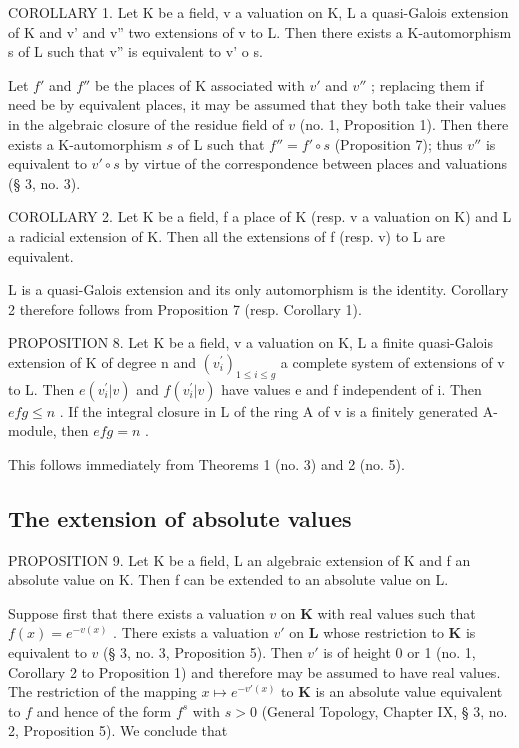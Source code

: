 COROLLARY 1. Let K be a field, v a valuation on K, L a quasi-Galois extension of K and v' and v'' two extensions of v to L. Then there exists a K-automorphism s of L such that v'' is equivalent to v' o s.

Let \(f'\) and \(f''\) be the places of K associated with \(v'\) and \(v''\) ; replacing them if need be by equivalent places, it may be assumed that they both take their values in the algebraic closure of the residue field of \(v\) (no. 1, Proposition 1). Then there exists a K-automorphism \(s\) of L such that \(f'' = f' \circ s\) (Proposition 7); thus \(v''\) is equivalent to \(v' \circ s\) by virtue of the correspondence between places and valuations (§ 3, no. 3).

COROLLARY 2. Let K be a field, f a place of K (resp. v a valuation on K) and L a radicial extension of K. Then all the extensions of f (resp. v) to L are equivalent.

L is a quasi-Galois extension and its only automorphism is the identity. Corollary 2 therefore follows from Proposition 7 (resp. Corollary 1).

PROPOSITION 8. Let K be a field, v a valuation on K, L a finite quasi-Galois extension of K of degree n and \((v_{i}^{\prime})_{1\leq i\leq g}\) a complete system of extensions of v to L. Then \(e(v_{i}^{\prime}|v)\) and \(f(v_{i}^{\prime}|v)\) have values e and f independent of i. Then \(efg \leqslant n\) . If the integral closure in L of the ring A of v is a finitely generated A-module, then \(efg = n\) .

This follows immediately from Theorems 1 (no. 3) and 2 (no. 5).

\subsection{The extension of absolute values}

PROPOSITION 9. Let K be a field, L an algebraic extension of K and f an absolute value on K. Then f can be extended to an absolute value on L.

Suppose first that there exists a valuation \(v\) on \(\mathbf{K}\) with real values such that \(f(x) = e^{-v(x)}\) . There exists a valuation \(v'\) on \(\mathbf{L}\) whose restriction to \(\mathbf{K}\) is equivalent to \(v\) (§ 3, no. 3, Proposition 5). Then \(v'\) is of height 0 or 1 (no. 1, Corollary 2 to Proposition 1) and therefore may be assumed to have real values. The restriction of the mapping \(x \mapsto e^{-v'(x)}\) to \(\mathbf{K}\) is an absolute value equivalent to \(f\) and hence of the form \(f^s\) with \(s > 0\) (General Topology, Chapter IX, § 3, no. 2, Proposition 5). We conclude that


